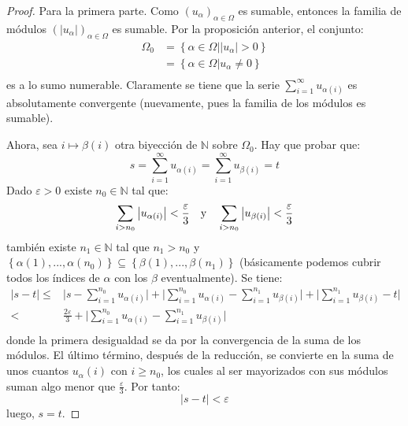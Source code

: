 \documentclass[12pt]{report}
\newcounter{it}
\theoremstyle{largebreak}
\newcommand\abs[1]{\ensuremath{\big|#1\big|}}
\begin{document}
    \begin{proof}
        Para la primera parte. Como $\left(u_\alpha \right)_{\alpha\in\Omega}$ es sumable, entonces la familia de módulos $\left(\abs{u_\alpha} \right)_{\alpha\in\Omega}$ es sumable. Por la proposición anterior, el conjunto:
        \begin{equation*}
            \begin{split}
                \Omega_0&=\left\{\alpha\in\Omega\Big|\abs{u_\alpha}>0 \right\}\\
                &=\left\{\alpha\in\Omega\Big|u_\alpha\neq0 \right\}\\
            \end{split}
        \end{equation*}
        es a lo sumo numerable. Claramente se tiene que la serie $\sum_{i=1 }^{\infty}u_{\alpha(i)}$ es absolutamente convergente (nuevamente, pues la familia de los módulos es sumable).

        Ahora, sea $i\mapsto\beta(i)$ otra biyección de $\mathbb{N}$ sobre $\Omega_0$. Hay que probar que:
        \begin{equation*}
            s=\sum_{i=1 }^{\infty}u_{\alpha(i)}=\sum_{i=1 }^{\infty}u_{\beta(i)}=t
        \end{equation*}
        Dado $\varepsilon>0$ existe $n_0\in\mathbb{N}$ tal que:
        \begin{equation*}
            \sum_{i>n_0 }\abs{u_{\alpha(i)} }<\frac{\varepsilon}{3}\quad\textup{y}\quad \sum_{i>n_0 }\abs{u_{\beta(i)} }<\frac{\varepsilon}{3}
        \end{equation*}
        también existe $n_1\in\mathbb{N}$ tal que $n_1>n_0$ y $\left\{\alpha(1),...,\alpha(n_0)\right\}\subseteq\left\{\beta(1),...,\beta(n_1) \right\}$ (básicamente podemos cubrir todos los índices de $\alpha$ con los $\beta$ eventualmente). Se tiene:
        \begin{equation*}
            \begin{split}
                \abs{s-t}\leq&\abs{s-\sum_{i=1 }^{n_0}u_{\alpha(i)}}+\abs{\sum_{i=1 }^{n_0 }u_{\alpha(i)}-\sum_{i=1 }^{n_1 }u_{\beta(i)}}+\abs{\sum_{i=1 }^{n_1}u_{\beta(i)}-t} \\
                < &\frac{2\varepsilon}{3}+\abs{\sum_{i=1 }^{n_0 }u_{\alpha(i)}-\sum_{i=1 }^{n_1 }u_{\beta(i)}}\\
            \end{split}
        \end{equation*}
        donde la primera desigualdad se da por la convergencia de la suma de los módulos. El último término, después de la reducción, se convierte en la suma de unos cuantos $u_\alpha(i)$ con $i\geq n_0$, los cuales al ser mayorizados con sus módulos suman algo menor que $\frac{\varepsilon}{3}$. Por tanto:
        \begin{equation*}
            \abs{s-t}<\varepsilon
        \end{equation*}
        luego, $s=t$.
    \end{proof}
\end{document}
